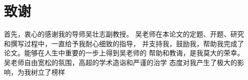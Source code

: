 \chapter*{致谢}
首先，衷心的感谢我的导师\raisebox{0.5mm}{------}吴壮志副教授。
吴老师在本论文的定题、开题、研究和撰写过程中，一直给予我耐心细致的指导，
并支持我，鼓励我，帮助我完成了论文。能够在人生中重要的一步上得到吴老师的
帮助和教诲，是我莫大的荣幸。吴老师自由宽松的氛围，高超的学术造诣和严谨的治学
态度对我产生了极大的影响，为我树立了榜样
\cleardoublepage
